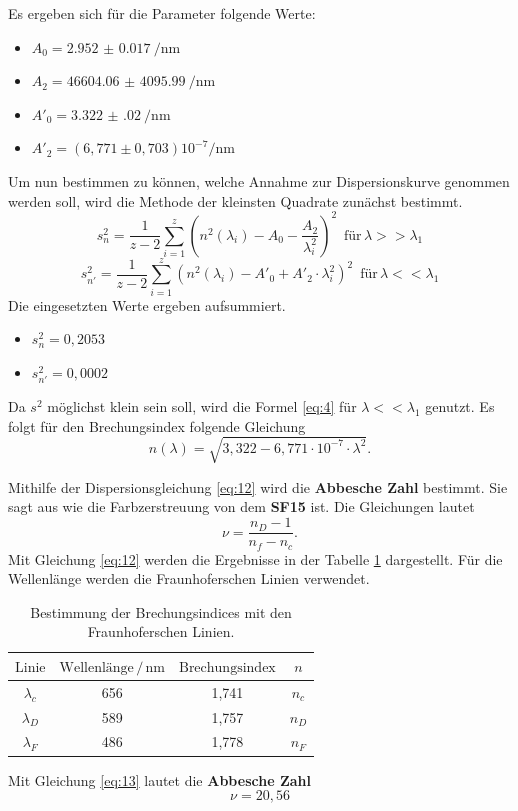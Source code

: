 Es ergeben sich für die Parameter folgende Werte:
\begin{itemize}
  \item $A_0 = \SI{2.952(17)}{\per\nano\meter}$
  \item $A_2 = \SI{46604.06(409599)}{\per\nano\meter}$
  \item $A'_0 = \SI{3.322(020)}{\per\nano\meter}$
  \item $A'_2 = (6,771 \pm 0,703)10^{-7} \si{\per\nano\meter}$
\end{itemize}
Um nun bestimmen zu können, welche Annahme zur Dispersionskurve genommen werden soll, wird
die Methode der kleinsten Quadrate zunächst bestimmt.
\begin{equation*}
  s^2_n = \frac{1}{z-2} \sum_{i=1}^{z}(n^2(\lambda_i)-A_0-\frac{A_2}{\lambda^2_i})^2 \,\,\, \text{für} \, \lambda >> \lambda_1
  \label{eq:10}
\end{equation*}
\begin{equation*}
  s^2_{n'} = \frac{1}{z-2} \sum_{i=1}^{z}(n^2(\lambda_i)-A'_0+A'_2 \cdot \lambda^2_i)^2 \,\,\, \text{für} \, \lambda << \lambda_1
  \label{eq:11}
\end{equation*}
Die eingesetzten Werte ergeben aufsummiert.
\begin{itemize}
  \item $s^2_n = 0,2053$
  \item $s^2_{n'} = 0,0002$
\end{itemize}
Da $s^2$ möglichst klein sein soll, wird die Formel \ref{eq:4} für $\lambda << \lambda_1$ genutzt.
Es folgt für den Brechungsindex folgende Gleichung
\begin{equation}
  n(\lambda)= \sqrt{3,322 - 6,771\cdot 10^{-7} \cdot \lambda^2}.
  \label{eq:12}
\end{equation}

Mithilfe der Dispersionsgleichung \ref{eq:12} wird die \textbf{Abbesche Zahl} bestimmt.
Sie sagt aus wie die Farbzerstreuung von dem \textbf{SF15} ist.
Die Gleichungen lautet
\begin{equation}
  \nu = \frac{n_D -1}{n_f-n_c}.
  \label{eq:13}
\end{equation}
Mit Gleichung \ref{eq:12} werden die Ergebnisse in der Tabelle \ref{tab:3}
dargestellt. Für die Wellenlänge werden die Fraunhoferschen Linien verwendet.
\begin{table}[H]
  \centering
  \caption{Bestimmung der Brechungsindices mit den Fraunhoferschen Linien.}
  \label{tab:3}
  \begin{tabular}{c c c c }
    \toprule
    $\text{Linie}$ & $\text{Wellenlänge} \,/\,\si{\nano\meter}$ & $\text{Brechungsindex}$ &$n$\\
    \midrule
    $\lambda_c$ & 656 & 1,741 & $n_c$\\
    $\lambda_D$ & 589 & 1,757 & $n_D$\\
    $\lambda_F$ & 486 & 1,778 & $n_F$\\
    \bottomrule
  \end{tabular}
\end{table}
Mit Gleichung \ref{eq:13} lautet die \textbf{Abbesche Zahl}
\begin{equation*}
  \nu = 20,56
\end{equation*}

